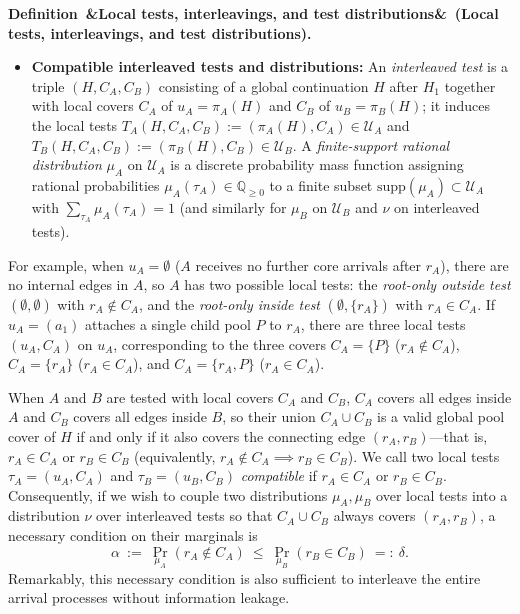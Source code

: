 \documentclass[11pt,letterpaper]{article}
\newenvironment{definition}[1][]{\refstepcounter{lemma}\par\medskip\noindent\textbf{Definition~\thelemma\ifx&#1&\else\ (#1)\fi.}\ \ignorespaces}{\par\medskip}
\begin{document}
\begin{definition}[Local tests, interleavings, and test distributions]
\begin{itemize}
\item \textbf{Compatible interleaved tests and distributions:} An \emph{interleaved test} is a triple $(H,C_A,C_B)$ consisting of a global continuation $H$ after $H_1$ together with local covers $C_A$ of $u_A=\pi_A(H)$ and $C_B$ of $u_B=\pi_B(H)$; it induces the local tests $T_A(H,C_A,C_B) := (\pi_A(H),C_A)\in\mathcal U_A$ and $T_B(H,C_A,C_B) := (\pi_B(H),C_B)\in\mathcal U_B$. A \emph{finite-support rational distribution} $\mu_A$ on $\mathcal U_A$ is a discrete probability mass function assigning rational probabilities $\mu_A(\tau_A)\in\mathbb Q_{\ge 0}$ to a finite subset $\mathrm{supp}(\mu_A)\subset\mathcal U_A$ with $\sum_{\tau_A}\mu_A(\tau_A)=1$ (and similarly for $\mu_B$ on $\mathcal U_B$ and $\nu$ on interleaved tests).
\end{itemize}
\end{definition}

For example, when $u_A=\emptyset$ ($A$ receives no further core arrivals after $r_A$), there are no internal edges in $A$, so $A$ has two possible local tests: the \emph{root-only outside test} $(\emptyset,\emptyset)$ with $r_A\notin C_A$, and the \emph{root-only inside test} $(\emptyset,\{r_A\})$ with $r_A\in C_A$. If $u_A=(a_1)$ attaches a single child pool $P$ to $r_A$, there are three local tests $(u_A,C_A)$ on $u_A$, corresponding to the three covers $C_A=\{P\}$ ($r_A\notin C_A$), $C_A=\{r_A\}$ ($r_A\in C_A$), and $C_A=\{r_A,P\}$ ($r_A\in C_A$).

When $A$ and $B$ are tested with local covers $C_A$ and $C_B$, $C_A$ covers all edges inside $A$ and $C_B$ covers all edges inside $B$, so their union $C_A\cup C_B$ is a valid global pool cover of $H$ if and only if it also covers the connecting edge $(r_A,r_B)$---that is, $r_A\in C_A$ or $r_B\in C_B$ (equivalently, $r_A\notin C_A \implies r_B\in C_B$). We call two local tests $\tau_A=(u_A,C_A)$ and $\tau_B=(u_B,C_B)$ \emph{compatible} if $r_A\in C_A$ or $r_B\in C_B$. Consequently, if we wish to couple two distributions $\mu_A,\mu_B$ over local tests into a distribution $\nu$ over interleaved tests so that $C_A\cup C_B$ always covers $(r_A,r_B)$, a necessary condition on their marginals is
\[
  \alpha\ :=\ \Pr_{\mu_A}(r_A\notin C_A)\ \le\ \Pr_{\mu_B}(r_B\in C_B)\ =:\ \delta .
\]
Remarkably, this necessary condition is also sufficient to interleave the entire arrival processes without information leakage.
\end{document}
